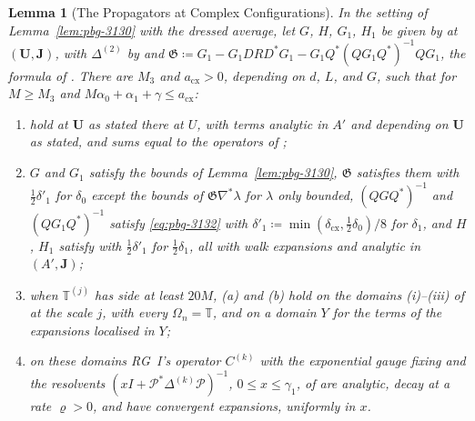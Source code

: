 \documentclass[11pt]{preprint}
\numberwithin{equation}{section}
\newtheorem{lemma}{Lemma}[section]
\theoremstyle{definition}
\theoremstyle{remark}
\theoremstyle{plain}
\begin{document}
\begin{lemma}[The Propagators at Complex Configurations]\label{lem:pbg-complex}
In the setting of Lemma~\ref{lem:pbg-3130} with the dressed average, let $G$, $H$, $G_1$, $H_1$ be given by \cite[(3.130), (3.126), (3.138), (3.129)]{BalabanPBG} at $(\mathbf U, \mathbf J)$, with $\Delta^{(2)}$ by \cite[(3.136)]{BalabanPBG} and $\mathfrak G \coloneqq G_1 - G_1DRD^*G_1 - G_1Q^*(QG_1Q^*)^{-1}QG_1$, the formula of \cite[(3.153), p.~426]{BalabanPBG}. There are $M_3$ and $a_{\mathrm{cx}} > 0$, depending on $d$, $L$, and $G$, such that for $M \geq M_3$ and $M\alpha_0 + \alpha_1 + \gamma \leq a_{\mathrm{cx}}$:
\begin{enumerate}[label=(\alph*)]
\item \cite[Corollaries~3.6, 3.8, Theorems~3.7--3.10]{BalabanPBG} hold at $\mathbf U$ as stated there at $U$, with terms analytic in $A'$ and depending on $\mathbf U$ as stated, and sums equal to the operators of \cite[Theorem~3.4]{BalabanPBG};
\item $G$ and $G_1$ satisfy the bounds of Lemma~\ref{lem:pbg-3130}, $\mathfrak G$ satisfies them with $\frac12\delta'_1$ for $\delta_0$ except the bounds of $\mathfrak G\nabla^*\lambda$ for $\lambda$ only bounded, $(QGQ^*)^{-1}$ and $(QG_1Q^*)^{-1}$ satisfy \eqref{eq:pbg-3132} with $\delta'_1 \coloneqq \min(\delta_{\mathrm{cx}}, \frac12\delta_0)/8$ for $\delta_1$, and $H$, $H_1$ satisfy \cite[(3.133)]{BalabanPBG} with $\frac12\delta'_1$ for $\frac12\delta_1$, all with walk expansions and analytic in $(A', \mathbf J)$;
\item when $\mathbb T^{(j)}$ has side at least $20M$, (a) and (b) hold on the domains (i)--(iii) of \cite[p.~262]{BalabanRG1} at the scale $j$, with every $\Omega_n = \mathbb T$, and on a domain $Y$ for the terms of the expansions localised in $Y$;
\item on these domains RG~I's operator $C^{(k)}$ with the exponential gauge fixing and the resolvents $(xI + \mathcal P^*\Delta^{(k)}\mathcal P)^{-1}$, $0 \leq x \leq \gamma_1$, of \cite[(2.7)]{BalabanRG2} are analytic, decay at a rate $\varrho > 0$, and have convergent expansions, uniformly in $x$.
\end{enumerate}
\end{lemma}
\end{document}
